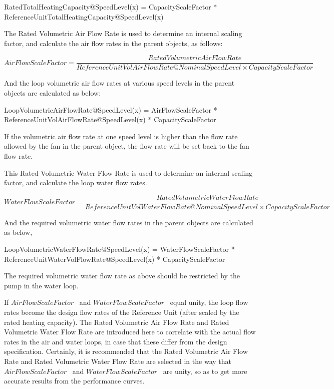 RatedTotalHeatingCapacity@SpeedLevel(x) = CapacityScaleFactor * ReferenceUnitTotalHeatingCapacity@SpeedLevel(x)

The Rated Volumetric Air Flow Rate is used to determine an internal scaling factor, and calculate the air flow rates in the parent objects, as follows:

{\scriptsize
\begin{equation}
AirFlowScaleFactor = \frac{{RatedVolumetricAirFlowRate}}{{ReferenceUnitVolAirFlowRate@NominalSpeedLevel \times CapacityScaleFactor}}
\end{equation}}

And the loop volumetric air flow rates at various speed levels in the parent objects are calculated as below:

LoopVolumetricAirFlowRate@SpeedLevel(x) = AirFlowScaleFactor * ReferenceUnitVolAirFlowRate@SpeedLevel(x) * CapacityScaleFactor

If the volumetric air flow rate at one speed level is higher than the flow rate allowed by the fan in the parent object, the flow rate will be set back to the fan flow rate.

This Rated Volumetric Water Flow Rate is used to determine an internal scaling factor, and calculate the loop water flow rates.

{\scriptsize
\begin{equation}
WaterFlowScaleFactor = \frac{{RatedVolumetricWaterFlowRate}}{{ReferenceUnitVolWaterFlowRate@NominalSpeedLevel \times CapacityScaleFactor}}
\end{equation}}

And the required volumetric water flow rates in the parent objects are calculated as below,

LoopVolumetricWaterFlowRate@SpeedLevel(x) = WaterFlowScaleFactor * ReferenceUnitWaterVolFlowRate@SpeedLevel(x) * CapacityScaleFactor

The required volumetric water flow rate as above should be restricted by the pump in the water loop.

If \(AirFlowScaleFactor\) ~and \(WaterFlowScaleFactor\) ~equal unity, the loop flow rates become the design flow rates of the Reference Unit (after scaled by the rated heating capacity). The Rated Volumetric Air Flow Rate and Rated Volumetric Water Flow Rate are introduced here to correlate with the actual flow rates in the air and water loops, in case that these differ from the design specification. Certainly, it is recommended that the Rated Volumetric Air Flow Rate and Rated Volumetric Water Flow Rate are selected in the way that \(AirFlowScaleFactor\) ~and \(WaterFlowScaleFactor\) ~are unity, so as to get more accurate results from the performance curves.

